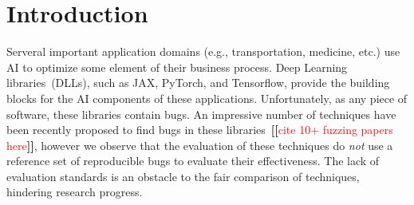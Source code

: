 \documentclass[sigconf]{acmart}
\newcommand{\Fix}[1]{\textbf{[[}\textcolor{red}{#1}\textbf{]]}}
\newcommand{\jax}{JAX}
\newcommand{\torch}{PyTorch}
\newcommand{\tf}{Tensorflow}
\begin{document}



\maketitle

\section{Introduction}

\sloppy Serveral important application domains (e.g., transportation,
medicine, etc.) use AI to optimize some element of their business
process. Deep Learning libraries~(DLLs), such as \jax, \torch{}, and
\tf{}, provide the building blocks for the AI components of these
applications.  Unfortunately, as any piece of software, these
libraries contain bugs. An impressive number of techniques have been
recently proposed to find bugs in these libraries~\Fix{cite 10+
  fuzzing papers here}, however we observe that the evaluation of
these techniques do \emph{not} use a reference set of reproducible
bugs to evaluate their effectiveness. The lack of evaluation standards
is an obstacle to the fair comparison of techniques, hindering
research progress.
\end{document}
